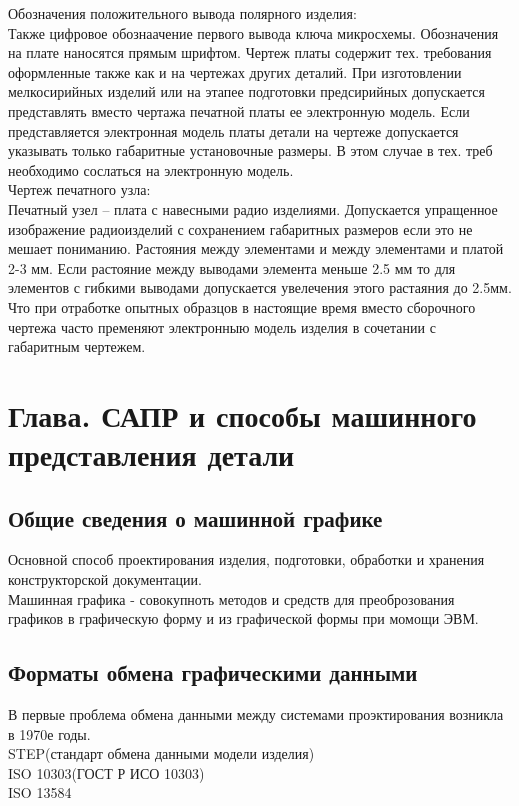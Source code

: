 \documentclass[a4paper, 12pt]{article}
\begin{document}
Обозначения положительного вывода полярного изделия:\\
Также цифровое обознаачение первого вывода ключа микросхемы. Обозначения на плате наносятся прямым шрифтом. Чертеж платы содержит тех. требования оформленные также как и на чертежах других деталий. При изготовлении мелкосирийных изделий или на этапее подготовки предсирийных допускается представлять вместо чертажа печатной платы ее электронную модель. Если представляется электронная модель платы детали на чертеже допускается указывать только габаритные установочные размеры. В этом случае в тех. треб необходимо сослаться на электронную модель.\\

Чертеж печатного узла:\\
Печатный узел  -- плата с навесными радио изделиями. Допускается упращенное изображение радиоизделий с сохранением габаритных размеров если это не мешает пониманию. Растояния между элементами и между элементами и платой 2-3 мм.
Если растояние между выводами элемента меньше 2.5 мм то для элементов с гибкими выводами допускается увелечения этого растаяния до 2.5мм. Что при отработке опытных образцов в настоящие время вместо сборочного чертежа часто пременяют электронныю модель изделия в сочетании с габаритным чертежем.

\section{Глава. САПР и способы машинного представления детали}
\subsection{Общие сведения о машинной графике}
Основной способ проектирования изделия, подготовки, обработки и хранения конструкторской документации. \\
Машинная графика - совокупноть методов и средств для преоброзования графиков в графическую форму и из графической формы при момощи ЭВМ.
\newpage
\subsection{Форматы обмена графическими данными}
В первые проблема обмена данными между системами проэктирования возникла в 1970е годы. \\
STEP(стандарт обмена данными модели изделия)\\
ISO 10303(ГОСТ Р ИСО 10303)\\
ISO 13584\\
\end{document}
